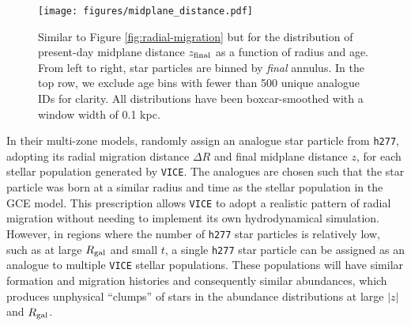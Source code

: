 \documentclass[twocolumn,twocolappendix]{aastex631}
\newcommand{\vice}{{\tt VICE}\xspace}
\newcommand{\hydro}{{\tt h277}\xspace}
\begin{document}
\begin{figure*}
    \centering
    \texttt{[image: figures/midplane\_distance.pdf]}
    \caption{Similar to Figure \ref{fig:radial-migration} but for the distribution of present-day midplane distance $z_{\rm final}$ as a function of radius and age. From left to right, star particles are binned by \textit{final} annulus. In the top row, we exclude age bins with fewer than 500 unique analogue IDs for clarity. All distributions have been boxcar-smoothed with a window width of 0.1 kpc.}
    \label{fig:midplane-distance}
\end{figure*}

In their multi-zone models,  randomly assign an analogue star particle from \hydro, adopting its radial migration distance $\Delta R$ and final midplane distance $z$, for each stellar population generated by \vice. The analogues are chosen such that the star particle was born at a similar radius and time as the stellar population in the GCE model. This prescription allows \vice to adopt a realistic pattern of radial migration without needing to implement its own hydrodynamical simulation. However, in regions where the number of \hydro star particles is relatively low, such as at large $R_{\rm gal}$ and small $t$, a single \hydro star particle can be assigned as an analogue to multiple \vice stellar populations. These populations will have similar formation and migration histories and consequently similar abundances, which produces unphysical ``clumps'' of stars in the abundance distributions at large $|z|$ and $R_{\rm gal}$.
\end{document}
